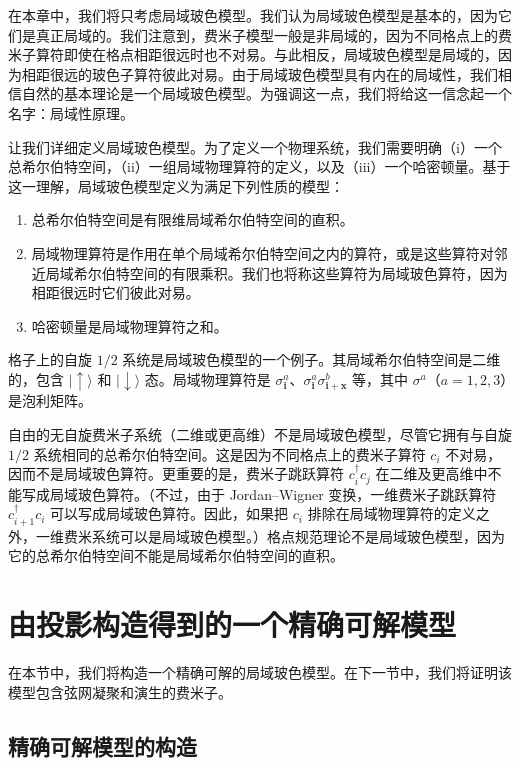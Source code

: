 在本章中，我们将只考虑局域玻色模型。我们认为局域玻色模型是基本的，因为它们是真正局域的。我们注意到，费米子模型一般是非局域的，因为不同格点上的费米子算符即使在格点相距很远时也不对易。与此相反，局域玻色模型是局域的，因为相距很远的玻色子算符彼此对易。由于局域玻色模型具有内在的局域性，我们相信自然的基本理论是一个局域玻色模型。为强调这一点，我们将给这一信念起一个名字：局域性原理。

让我们详细定义局域玻色模型。为了定义一个物理系统，我们需要明确（i）一个总希尔伯特空间，（ii）一组局域物理算符的定义，以及（iii）一个哈密顿量。基于这一理解，局域玻色模型定义为满足下列性质的模型：

\begin{enumerate}
\item[(i)] 总希尔伯特空间是有限维局域希尔伯特空间的直积。
\item[(ii)] 局域物理算符是作用在单个局域希尔伯特空间之内的算符，或是这些算符对邻近局域希尔伯特空间的有限乘积。我们也将称这些算符为局域玻色算符，因为相距很远时它们彼此对易。
\item[(iii)] 哈密顿量是局域物理算符之和。
\end{enumerate}

格子上的自旋 $1/2$ 系统是局域玻色模型的一个例子。其局域希尔伯特空间是二维的，包含 $|\uparrow\rangle$ 和 $|\downarrow\rangle$ 态。局域物理算符是 $\sigma_{\pmb{i}}^{a}$、$\sigma_{\pmb{i}}^{a}\sigma_{\pmb{i}+\pmb{x}}^{b}$ 等，其中 $\sigma^{a}$（$a=1,2,3$）是泡利矩阵。

自由的无自旋费米子系统（二维或更高维）不是局域玻色模型，尽管它拥有与自旋 $1/2$ 系统相同的总希尔伯特空间。这是因为不同格点上的费米子算符 $c_i$ 不对易，因而不是局域玻色算符。更重要的是，费米子跳跃算符 $c_i^\dagger c_j$ 在二维及更高维中不能写成局域玻色算符。（不过，由于 Jordan--Wigner 变换，一维费米子跳跃算符 $c_{i+1}^\dagger c_i$ 可以写成局域玻色算符。因此，如果把 $c_i$ 排除在局域物理算符的定义之外，一维费米系统可以是局域玻色模型。）格点规范理论不是局域玻色模型，因为它的总希尔伯特空间不能是局域希尔伯特空间的直积。

\section{由投影构造得到的一个精确可解模型}

在本节中，我们将构造一个精确可解的局域玻色模型。在下一节中，我们将证明该模型包含弦网凝聚和演生的费米子。

\subsection{精确可解模型的构造}

